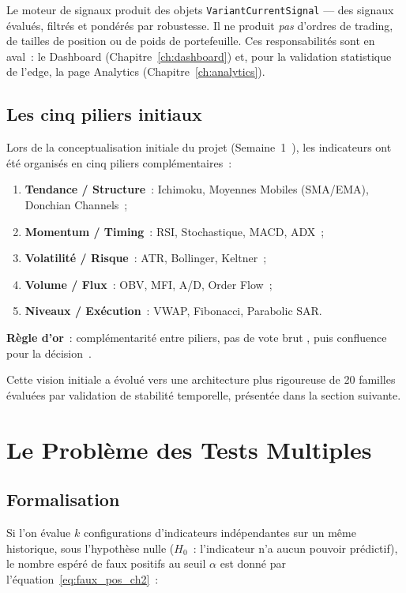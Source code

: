 Le moteur de signaux produit des objets \texttt{VariantCurrentSignal} — des signaux
évalués, filtrés et pondérés par robustesse. Il ne produit \emph{pas} d'ordres de
trading, de tailles de position ou de poids de portefeuille. Ces responsabilités
sont en aval~: le Dashboard (Chapitre~\ref{ch:dashboard}) et, pour la validation statistique de l'edge, la page Analytics (Chapitre~\ref{ch:analytics}).

\subsection{Les cinq piliers initiaux}

Lors de la conceptualisation initiale du projet (Semaine~1~\cite{rapport_s1}), les
indicateurs ont été organisés en cinq piliers complémentaires~:

\begin{enumerate}
    \item \textbf{Tendance / Structure}~: Ichimoku, Moyennes Mobiles (SMA/EMA),
    Donchian Channels~;
    \item \textbf{Momentum / Timing}~: RSI, Stochastique, MACD, ADX~;
    \item \textbf{Volatilité / Risque}~: ATR, Bollinger, Keltner~;
    \item \textbf{Volume / Flux}~: OBV, MFI, A/D, Order Flow~;
    \item \textbf{Niveaux / Exécution}~: VWAP, Fibonacci, Parabolic SAR.
\end{enumerate}

\textbf{Règle d'or}~: complémentarité entre piliers, pas de \og vote brut \fg{},
puis confluence pour la décision~\cite{rapport_s1}.

\medskip

Cette vision initiale a évolué vers une architecture plus rigoureuse de 20 familles
évaluées par validation de stabilité temporelle, présentée dans la section suivante.

\section{Le Problème des Tests Multiples}
\label{sec:tests_multiples}

\subsection{Formalisation}

Si l'on évalue $k$ configurations d'indicateurs indépendantes sur un même historique,
sous l'hypothèse nulle ($H_0$~: l'indicateur n'a aucun pouvoir prédictif), le nombre
espéré de faux positifs au seuil $\alpha$ est donné par l'équation~\eqref{eq:faux_pos_ch2}~:

